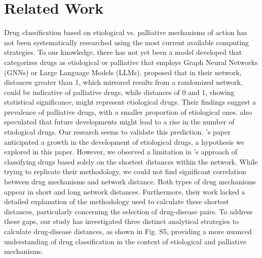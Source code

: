 \documentclass[journal,twoside,web]{ieeecolor}
\begin{document}
\section{Related Work}
Drug classification based on etiological vs. palliative mechanisms of action has not been systematically researched using the most current available computing strategies.
To our knowledge, there has not yet been a model developed that categorizes drugs as etiological or palliative that employs Graph Neural Networks (GNNs) or Large Language Models (LLMs).
\cite{yildirim2007drug} proposed that in their network, distances greater than 1, which mirrored results from a randomized network, could be indicative of palliative drugs, while distances of 0 and 1, showing statistical significance, might represent etiological drugs.
Their findings suggest a prevalence of palliative drugs, with a smaller proportion of etiological ones.
\cite{yildirim2007drug} also speculated that future developments might lead to a rise in the number of etiological drugs.
Our research seems to validate this prediction.
\cite{yildirim2007drug}'s paper anticipated a growth in the development of etiological drugs, a hypothesis we explored in this paper.
However, we observed a limitation in \cite{yildirim2007drug}'s approach of classifying drugs based solely on the shortest distances within the network.
While trying to replicate their methodology, we could not find significant correlation between drug mechanisms and network distance.
Both types of drug mechanisms appear in short and long network distances. 
Furthermore, their work lacked a detailed explanation of the methodology used to calculate these shortest distances, particularly concerning the selection of drug-disease pairs.
To address these gaps, our study has investigated three distinct analytical strategies to calculate drug-disease distances, as shown in Fig. S5, %
providing a more nuanced understanding of drug classification in the context of etiological and palliative mechanisms.

\end{document}
